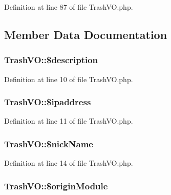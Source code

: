 Definition at line 87 of file Trash\+V\+O.\+php.



\subsection{Member Data Documentation}
\subsubsection[{\texorpdfstring{\$description}{$description}}]{\setlength{\rightskip}{0pt plus 5cm}Trash\+V\+O\+::\$description}\hypertarget{classTrashVO_abf2e10398265d4954a9e23f06b29a190}{}\label{classTrashVO_abf2e10398265d4954a9e23f06b29a190}


Definition at line 10 of file Trash\+V\+O.\+php.

\subsubsection[{\texorpdfstring{\$ipaddress}{$ipaddress}}]{\setlength{\rightskip}{0pt plus 5cm}Trash\+V\+O\+::\$ipaddress}\hypertarget{classTrashVO_add9ea842dcdbcd81a3fef932cd622e18}{}\label{classTrashVO_add9ea842dcdbcd81a3fef932cd622e18}


Definition at line 11 of file Trash\+V\+O.\+php.

\subsubsection[{\texorpdfstring{\$nick\+Name}{$nickName}}]{\setlength{\rightskip}{0pt plus 5cm}Trash\+V\+O\+::\$nick\+Name}\hypertarget{classTrashVO_a8084a8637a7a98cc7f1182bd7b86e5de}{}\label{classTrashVO_a8084a8637a7a98cc7f1182bd7b86e5de}


Definition at line 14 of file Trash\+V\+O.\+php.

\subsubsection[{\texorpdfstring{\$origin\+Module}{$originModule}}]{\setlength{\rightskip}{0pt plus 5cm}Trash\+V\+O\+::\$origin\+Module}\hypertarget{classTrashVO_ad977787e04708af64f4c9d4891d3f682}{}\label{classTrashVO_ad977787e04708af64f4c9d4891d3f682}


